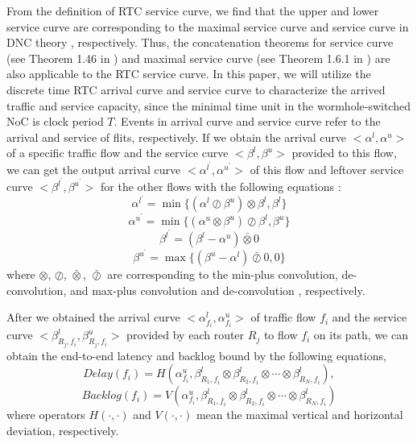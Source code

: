 \documentclass[10pt,journal]{IEEEtran}
\begin{document}
From the definition of RTC service curve, we find that the upper and lower service curve are corresponding to the maximal service curve and service curve in DNC theory \cite{Boudec2001Network}, respectively. Thus, the concatenation theorems for service curve (see Theorem 1.46 in \cite{Boudec2001Network}) and maximal service curve (see Theorem 1.6.1 in \cite{Boudec2001Network}) are also applicable to the RTC service curve. In this paper, we will utilize the discrete time RTC arrival curve and service curve to characterize the arrived traffic and service capacity, since the minimal time unit in the wormhole-switched NoC is clock period $T$. Events in arrival curve and service curve refer to the arrival and service of flits, respectively. If we obtain the arrival curve $<\alpha^l,\alpha^u>$ of a specific traffic flow and the service curve $<\beta^l,\beta^u>$ provided to this flow, we can get the output arrival curve $<\alpha^{l^\prime},\alpha^{u^\prime}>$ of this flow and leftover service curve $<\beta^{l^\prime},\beta^{u^\prime}>$ for the other flows with the following equations \cite{1253607}:
\begin{equation}\label{alphal}
\alpha^{l^\prime}=\min\{(\alpha^l\oslash\beta^u)\otimes\beta^l,\beta^l\}
\end{equation}
\begin{equation}\label{alphau}
\alpha^{u^\prime}=\min\{(\alpha^u\otimes\beta^u)\oslash\beta^l,\beta^u\}
\end{equation}
\begin{equation}\label{betal}
\beta^{l^\prime}=(\beta^l-\alpha^u)\bar{\otimes}0
\end{equation}
\begin{equation}\label{betau}
\beta^{u^\prime}=\max\{(\beta^u-\alpha^l)\bar{\oslash}0,0\}
\end{equation}
where $\otimes$, $\oslash$, $\bar{\otimes}$, $\bar{\oslash}$ are corresponding to the min-plus convolution, de-convolution, and max-plus convolution and de-convolution \cite{Boudec2001Network}, respectively.

After we obtained the arrival curve $<\alpha^l_{f_i},\alpha^u_{f_i}>$ of traffic flow $f_i$ and the service curve $<\beta_{R_j,f_i}^l,\beta_{R_j,f_i}^u>$ provided by each router $R_j$ to flow $f_i$ on its path, we can obtain the end-to-end latency and backlog bound by the following equations,
\begin{equation}\label{delay}
Delay(f_i)=H(\alpha^u_{f_i},\beta^l_{R_1,f_i}\otimes\beta^l_{R_2,f_i}\otimes\cdots\otimes\beta^l_{R_N,f_i}),
\end{equation}
\begin{equation}\label{backlog}
Backlog(f_i)=V(\alpha^u_{f_i},\beta^l_{R_1,f_i}\otimes\beta^l_{R_2,f_i}\otimes\cdots\otimes\beta^l_{R_N,f_i})
\end{equation}
where operators $H(\cdot,\cdot)$ and $V(\cdot,\cdot)$ mean the maximal vertical and horizontal deviation, respectively.
\end{document}
